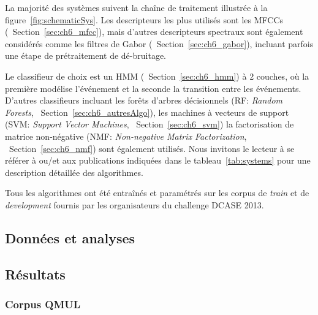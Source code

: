 La majorité des systèmes suivent la chaîne de traitement illustrée à la figure~\ref{fig:schematicSys}. Les descripteurs les plus utilisés sont les MFCCs (\cf~Section~\ref{sec:ch6_mfcc}), mais d'autres descripteurs spectraux sont également considérés comme les filtres de Gabor (\cf~Section~\ref{sec:ch6_gabor}), incluant parfois une étape de prétraitement de dé-bruitage.

Le classifieur de choix est un HMM (\cf~Section~\ref{sec:ch6_hmm})  à 2 couches, où la première modélise l'événement et la seconde la transition entre les événements. D'autres classifieurs incluant les forêts d’arbres décisionnels (RF: \emph{Random Forests}, \cf~Section~\ref{sec:ch6_autresAlgo}), les machines à vecteurs de support (SVM: \emph{Support Vector Machines}, \cf~Section~\ref{sec:ch6_svm}) la factorisation de matrice non-négative (NMF: \emph{Non-negative Matrix Factorization}, \cf~Section~\ref{sec:ch6_nmf}) sont également utilisés. Nous invitons le lecteur à se référer à \citep{Stowell15} ou/et aux publications indiquées dans le tableau~\ref{tab:systems} pour une description détaillée des algorithmes.

Tous les algorithmes ont été entraînés et paramétrés sur les corpus de \emph{train} et de \emph{development} fournis par les organisateurs du challenge DCASE 2013.

\subsection{Données et analyses}


\subsection{Résultats}

\subsubsection{Corpus QMUL}

